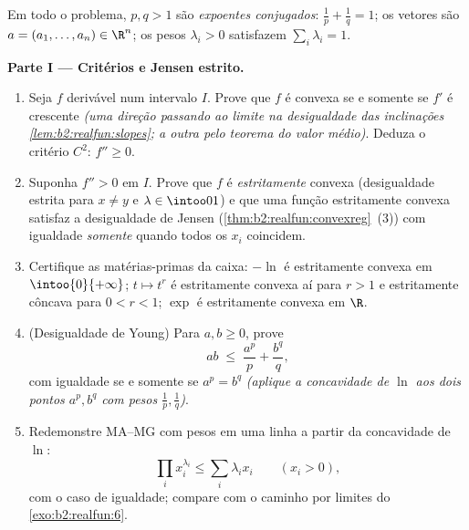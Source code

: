 \begin{problem}
\label{pb:b2:realfun:1}
Em todo o problema, $p, q > 1$ são \emph{expoentes conjugados}: $\frac1p +
\frac1q = 1$; os vetores são $a = (a_1, \dots, a_n) \in \R^n$;
os pesos $\lambda_i > 0$ satisfazem $\sum_i\lambda_i = 1$.

\medskip
\noindent\textbf{Parte I --- Critérios e Jensen estrito.}
\begin{enumerate}
  \item Seja $f$ derivável num intervalo $I$. Prove que
        $f$ é convexa se e somente se $f'$ é crescente
        \emph{(uma direção passando ao limite na
        desigualdade das inclinações \cref{lem:b2:realfun:slopes}; a
        outra pelo teorema do valor médio)}. Deduza o critério
        $C^2$: $f'' \geq 0$.
  \item Suponha $f''> 0$ em $I$. Prove que $f$ é
        \emph{estritamente} convexa (desigualdade estrita para $x \neq y$
        e $\lambda \in \intoo01$) e que uma função estritamente convexa
        satisfaz a desigualdade de Jensen
        (\cref{thm:b2:realfun:convexreg}~(3)) com igualdade
        \emph{somente} quando todos os $x_i$ coincidem.
  \item Certifique as matérias-primas da caixa: $-\ln$ é estritamente
        convexa em $\intoo{0}{+\infty}$; $t \mapsto t^r$ é
        estritamente convexa aí para $r > 1$ e estritamente côncava
        para $0 < r < 1$; $\exp$ é estritamente convexa em $\R$.
  \item (Desigualdade de Young) Para $a, b \geq 0$, prove
        \[
        ab \;\leq\; \frac{a^p}{p} + \frac{b^q}{q},
        \]
        com igualdade se e somente se $a^p = b^q$ \emph{(aplique
        a concavidade de $\ln$ aos dois pontos $a^p, b^q$
        com pesos $\frac1p, \frac1q$)}.
  \item Redemonstre MA--MG com pesos em uma linha a partir da
        concavidade de $\ln$:
        \[
        \prod_i x_i^{\lambda_i} \leq \sum_i\lambda_ix_i \qquad
        (x_i > 0),
        \]
        com o caso de igualdade; compare com o caminho por limites do
        \cref{exo:b2:realfun:6}.
\end{enumerate}


\end{problem}
